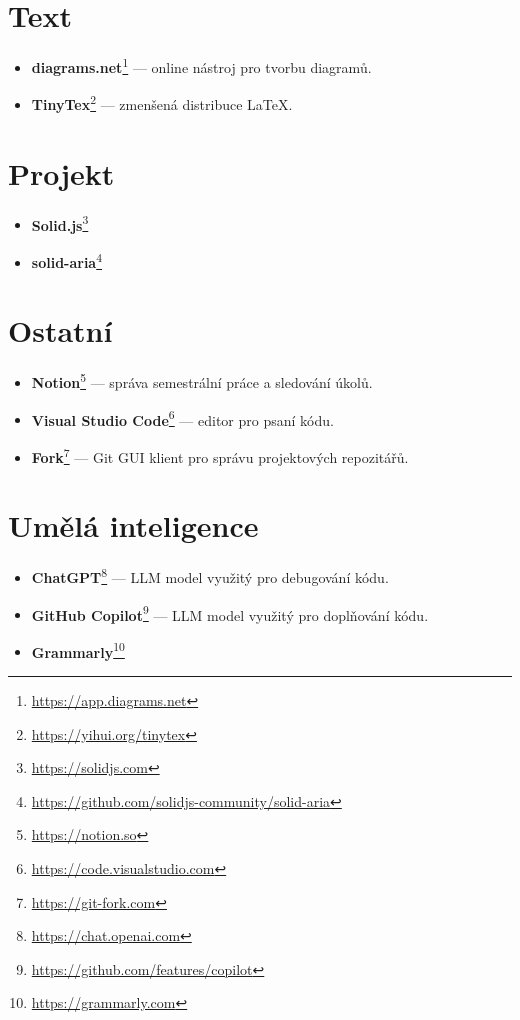 \section{Text}

\begin{itemize}
    \item \textbf{diagrams.net}\footnote{\url{https://app.diagrams.net}} --- online nástroj pro tvorbu diagramů.
    \item \textbf{TinyTex}\footnote{\url{https://yihui.org/tinytex}} --- zmenšená distribuce \LaTeX.
\end{itemize}

\section{Projekt}

\begin{itemize}
    \item \textbf{Solid.js}\footnote{\url{https://solidjs.com}}
    \item \textbf{solid-aria}\footnote{\url{https://github.com/solidjs-community/solid-aria}}
\end{itemize}

\section{Ostatní}

\begin{itemize}
    \item \textbf{Notion}\footnote{\url{https://notion.so}} --- správa semestrální práce a sledování úkolů.
    \item \textbf{Visual Studio Code}\footnote{\url{https://code.visualstudio.com}} --- editor pro psaní kódu.
    \item \textbf{Fork}\footnote{\url{https://git-fork.com}} --- Git GUI klient pro správu projektových repozitářů.
\end{itemize}

\section{Umělá inteligence}

\begin{itemize}
    \item \textbf{ChatGPT}\footnote{\url{https://chat.openai.com}} --- LLM model využitý pro debugování kódu.
    \item \textbf{GitHub Copilot}\footnote{\url{https://github.com/features/copilot}} --- LLM model využitý pro doplňování kódu.
    \item \textbf{Grammarly}\footnote{\url{https://grammarly.com}}
\end{itemize}
